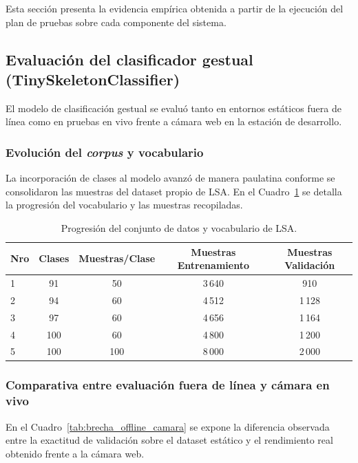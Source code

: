 Esta sección presenta la evidencia empírica obtenida a partir de la ejecución del plan de pruebas sobre cada componente del sistema.

\subsection{Evaluación del clasificador gestual (TinySkeletonClassifier)}
\label{sec:res_clasificador}

El modelo de clasificación gestual se evaluó tanto en entornos estáticos fuera de línea como en pruebas en vivo frente a cámara web en la estación de desarrollo.

\subsubsection{Evolución del \textit{corpus} y vocabulario}
La incorporación de clases al modelo avanzó de manera paulatina conforme se consolidaron las muestras del dataset propio de LSA. En el Cuadro~\ref{tab:evolucion_corpus} se detalla la progresión del vocabulario y las muestras recopiladas.

\begin{table}[H]
    \centering
    \small
    \caption{Progresión del conjunto de datos y vocabulario de LSA.}
    \label{tab:evolucion_corpus}
    \begin{tabular}{lcccc}
        \toprule
        \textbf{Nro} & \textbf{Clases} & \textbf{Muestras/Clase} & \textbf{Muestras Entrenamiento} & \textbf{Muestras Validación} \\
        \midrule
        1 & 91 & 50 & 3\,640 & 910 \\
        2 & 94 & 60 & 4\,512 & 1\,128 \\
        3 & 97 & 60 & 4\,656 & 1\,164 \\
        4 & 100 & 60 & 4\,800 & 1\,200 \\
        5 & 100 & 100 & 8\,000 & 2\,000 \\
        \bottomrule
    \end{tabular}
\end{table}

\subsubsection{Comparativa entre evaluación fuera de línea y cámara en vivo}
En el Cuadro~\ref{tab:brecha_offline_camara} se expone la diferencia observada entre la exactitud de validación sobre el dataset estático y el rendimiento real obtenido frente a la cámara web.

